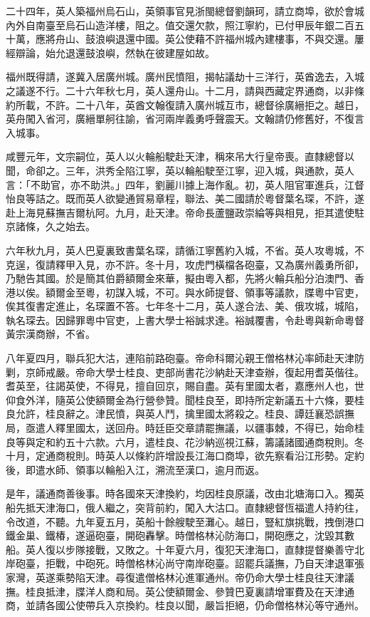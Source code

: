 \begin{pinyinscope}
二十四年，英人築福州烏石山，英領事官見浙閩總督劉韻珂，請立商埠，欲於會城內外自南臺至烏石山造洋樓，阻之。值交還欠款，照江寧約，已付甲辰年銀二百五十萬，應將舟山、鼓浪嶼退還中國。英公使藉不許福州城內建樓事，不與交還。屢經辯論，始允退還鼓浪嶼，然執在彼建屋如故。

福州既得請，遂冀入居廣州城。廣州民憤阻，揭帖議劫十三洋行，英酋逸去，入城之議遂不行。二十六年秋七月，英人還舟山。十二月，請與西藏定界通商，以非條約所載，不許。二十八年，英酋文翰復請入廣州城互市，總督徐廣縉拒之。越日，英舟闖入省河，廣縉單舸往諭，省河兩岸義勇呼聲震天。文翰請仍修舊好，不復言入城事。

咸豐元年，文宗嗣位，英人以火輪船駛赴天津，稱來吊大行皇帝喪。直隸總督以聞，命卻之。三年，洪秀全陷江寧，英以輪船駛至江寧，迎入城，與通款，英人言：「不助官，亦不助洪。」四年，劉麗川據上海作亂。初，英人阻官軍進兵，江督怡良等詰之。既而英人欲變通貿易章程，聯法、美二國請於粵督葉名琛，不許，遂赴上海見蘇撫吉爾杭阿。九月，赴天津。帝命長蘆鹽政崇綸等與相見，拒其遣使駐京諸條，久之始去。

六年秋九月，英人巴夏裏致書葉名琛，請循江寧舊約入城，不省。英人攻粵城，不克逞，復請釋甲入見，亦不許。冬十月，攻虎門橫檔各砲臺，又為廣州義勇所卻，乃馳告其國。於是簡其伯爵額爾金來華，擬由粵入都，先將火輪兵船分泊澳門、香港以俟。額爾金至粵，初謀入城，不可。與水師提督、領事等議款，牒粵中官吏，俟其復書定進止，名琛置不答。七年冬十二月，英人遂合法、美、俄攻城，城陷，執名琛去。因歸罪粵中官吏，上書大學士裕誠求達。裕誠覆書，令赴粵與新命粵督黃宗漢商辦，不省。

八年夏四月，聯兵犯大沽，連陷前路砲臺。帝命科爾沁親王僧格林沁率師赴天津防剿，京師戒嚴。帝命大學士桂良、吏部尚書花沙納赴天津查辦，復起用耆英偕往。耆英至，往謁英使，不得見，擅自回京，賜自盡。英有里國太者，嘉應州人也，世仰食外洋，隨英公使額爾金為行營參贊。聞桂良至，即持所定新議五十六條，要桂良允許，桂良辭之。津民憤，與英人鬥，擒里國太將殺之。桂良、譚廷襄恐誤撫局，亟遣人釋里國太，送回舟。時廷臣交章請罷撫議，以疆事棘，不得已，始命桂良等與定和約五十六款。六月，遣桂良、花沙納巡視江蘇，籌議諸國通商稅則。冬十月，定通商稅則。時英人以條約許增設長江海口商埠，欲先察看沿江形勢。定約後，即遣水師、領事以輪船入江，溯流至漢口，逾月而返。

是年，議通商善後事。時各國來天津換約，均因桂良原議，改由北塘海口入。獨英船先抵天津海口，俄人繼之，突背前約，闖入大沽口。直隸總督恆福遣人持約往，令改道，不聽。九年夏五月，英船十餘艘駛至灘心。越日，豎紅旗挑戰，拽倒港口鐵金巢、鐵椿，遂逼砲臺，開砲轟擊。時僧格林沁防海口，開砲應之，沈毀其數船。英人復以步隊接戰，又敗之。十年夏六月，復犯天津海口，直隸提督樂善守北岸砲臺，拒戰，中砲死。時僧格林沁尚守南岸砲臺。詔罷兵議撫，乃自天津退軍張家灣，英遂乘勢陷天津。尋復遣僧格林沁進軍通州。帝仍命大學士桂良往天津議撫。桂良抵津，牒洋人商和局。英公使額爾金、參贊巴夏裏請增軍費及在天津通商，並請各國公使帶兵入京換約。桂良以聞，嚴旨拒絕，仍命僧格林沁等守通州。


\end{pinyinscope}
